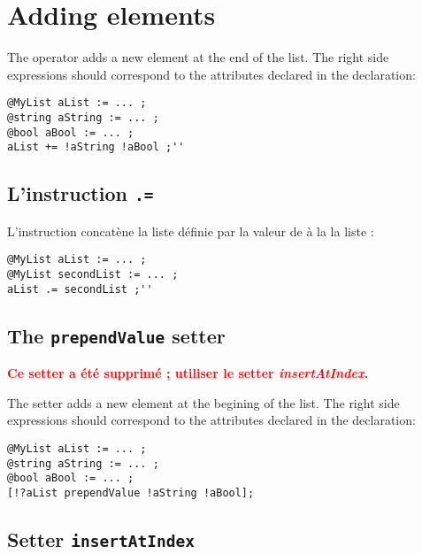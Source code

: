 \section{Adding elements}


The  \galgas{+=} operator adds a new element at the end of the list. The right side expressions should correspond to the attributes declared in the  declaration:\\

\begin{lstlisting}[language=galgas]
@MyList aList := ... ;
@string aString := ... ;
@bool aBool := ... ;
aList += !aString !aBool ;''
\end{lstlisting}


\subsection{L'instruction \texttt{.=}}

L'instruction  concatène la liste définie par la valeur de  à la la liste  :

\begin{lstlisting}[language=galgas]
@MyList aList := ... ;
@MyList secondList := ... ;
aList .= secondList ;''
\end{lstlisting}



\subsection{The \texttt{prependValue} setter}

{\bf \textcolor{red}{Ce setter a été supprimé ; utiliser le setter \emph{insertAtIndex}.}}

The  setter adds a new element at the begining of the list. The right side expressions should correspond to the attributes declared in the   declaration:

\begin{lstlisting}[language=galgas]
@MyList aList := ... ;
@string aString := ... ;
@bool aBool := ... ;
[!?aList prependValue !aString !aBool];
\end{lstlisting}




\subsection{Setter \texttt{insertAtIndex}}

